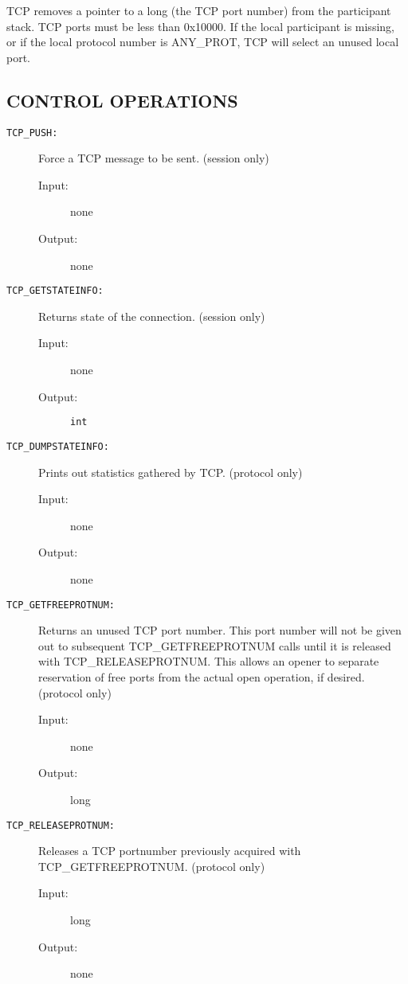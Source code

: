 TCP removes a pointer to a long (the TCP port number) from the
participant stack.  TCP ports must be less than 0x10000.  
If the local participant is missing, or if the
local protocol number is ANY\_PROT, TCP will select an unused local
port. 


\subsection*{CONTROL OPERATIONS}

\begin{description}

\item[{\tt TCP\_PUSH:}]
Force a TCP message to be sent.  (session only)
\begin{description}
\item[{\rm Input:}] none
\item[{\rm Output:}] none
\end{description}

\item[{\tt TCP\_GETSTATEINFO:}]
Returns state of the connection.  (session only)
\begin{description}
\item[{\rm Input:}] none
\item[{\rm Output:}] {\tt int}
\end{description}

\item[{\tt TCP\_DUMPSTATEINFO:}]
Prints out statistics gathered by TCP.  (protocol only)
\begin{description}
\item[{\rm Input:}] none
\item[{\rm Output:}] none
\end{description}

\item[{\tt TCP\_GETFREEPROTNUM:}]
Returns an unused TCP port number.  This port number will not be given
out to subsequent TCP\_GETFREEPROTNUM calls until it is released with
TCP\_RELEASEPROTNUM.  This allows an opener to separate reservation of
free ports from the actual open operation, if desired.
(protocol only) 
\begin{description}
\item[{\rm Input:}] none
\item[{\rm Output:}] long
\end{description}

\item[{\tt TCP\_RELEASEPROTNUM:}]
Releases a TCP portnumber previously acquired with TCP\_GETFREEPROTNUM.
(protocol only)
\begin{description}
\item[{\rm Input:}] long
\item[{\rm Output:}] none
\end{description}



\end{description}
